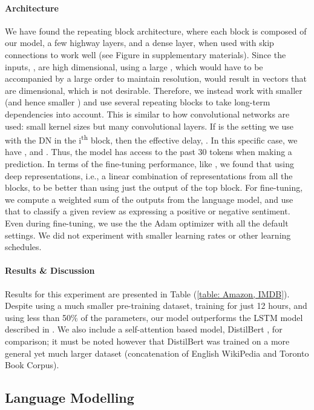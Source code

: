 \documentclass{article}
\begin{document}
\paragraph{Architecture} We have found the repeating block architecture, where each block is composed of our model, a few highway layers, and a dense layer, when used with skip connections to work well (see Figure in supplementary materials). Since the inputs, , are high dimensional, using a large , which would have to be accompanied by a large order  to maintain resolution, would result in  vectors that are  dimensional, which is not desirable. Therefore, we instead work with smaller  (and hence smaller ) and use several repeating blocks to take long-term dependencies into account. This is similar to how convolutional networks are used: small kernel sizes but many convolutional layers. If  is the setting we use with the DN in the i\textsuperscript{th} block, then the effective delay, . In this specific case, we have , and . Thus, the model has access to the past 30 tokens when making a prediction. In terms of the fine-tuning performance, like \citet{Peters:2018}, we found that using deep representations, i.e., a linear combination of representations from all the blocks, to be better than using just the output of the top block. For fine-tuning, we compute a weighted sum of the outputs from the language model, and use that to classify a given review as expressing a positive or negative sentiment. Even during fine-tuning, we use the the Adam optimizer with all the default settings. We did not experiment with smaller learning rates or other learning schedules. 

\paragraph{Results \& Discussion} Results for this experiment are presented in Table (\ref{table: Amazon, IMDB}). Despite using a much smaller pre-training dataset, training for just 12 hours, and using less than 50\% of the parameters, our model outperforms the LSTM model described in \citet{radford2017learning}. We also include a self-attention based model, DistilBert \cite{sanh2019distilbert}, for comparison; it must be noted however that DistilBert was trained on a more general yet much larger dataset (concatenation of English WikiPedia and Toronto Book Corpus). 


\subsection{Language Modelling}
\end{document}

